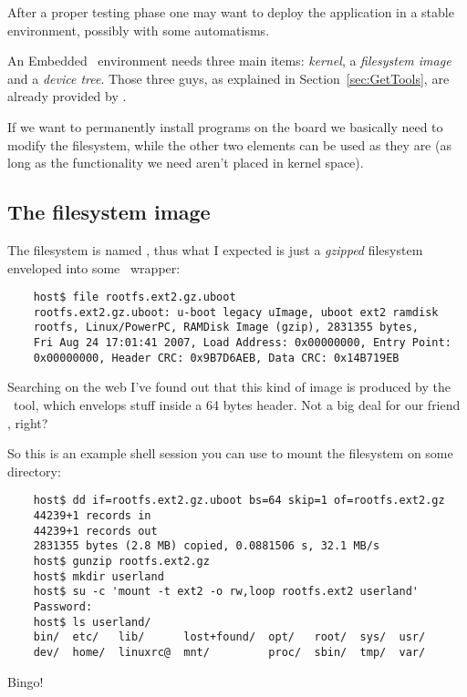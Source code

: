 After a proper testing phase one may want to deploy the application in a
stable environment, possibly with some automatisms.

An Embedded \Linux\ environment needs three main items: \emph{kernel}, a
\emph{filesystem image} and a \emph{device tree}. Those three guys, as
explained in Section~\ref{sec:GetTools}, are already provided by
.

If we want to permanently install programs on the board we basically need
to modify the filesystem, while the other two elements can be used as they
are (as long as the functionality we need aren't placed in kernel space).

\subsection{The filesystem image}

    The filesystem is named , thus what I
    expected is just a \emph{gzipped}  filesystem enveloped
    into some \uBoot\ wrapper:

\begin{lstlisting}
    host$ file rootfs.ext2.gz.uboot
    rootfs.ext2.gz.uboot: u-boot legacy uImage, uboot ext2 ramdisk
    rootfs, Linux/PowerPC, RAMDisk Image (gzip), 2831355 bytes,
    Fri Aug 24 17:01:41 2007, Load Address: 0x00000000, Entry Point:
    0x00000000, Header CRC: 0x9B7D6AEB, Data CRC: 0x14B719EB
\end{lstlisting}

    Searching on the web I've found out that this kind of image is
    produced by the \mkimage\ tool, which envelops stuff inside a 64 bytes
    header. Not a big deal for our friend , right?

    So this is an example shell session you can use to mount the
    filesystem on some directory:
\begin{lstlisting}
    host$ dd if=rootfs.ext2.gz.uboot bs=64 skip=1 of=rootfs.ext2.gz
    44239+1 records in
    44239+1 records out
    2831355 bytes (2.8 MB) copied, 0.0881506 s, 32.1 MB/s
    host$ gunzip rootfs.ext2.gz
    host$ mkdir userland
    host$ su -c 'mount -t ext2 -o rw,loop rootfs.ext2 userland'
    Password:
    host$ ls userland/
    bin/  etc/   lib/      lost+found/  opt/   root/  sys/  usr/
    dev/  home/  linuxrc@  mnt/         proc/  sbin/  tmp/  var/
\end{lstlisting}
    Bingo!



